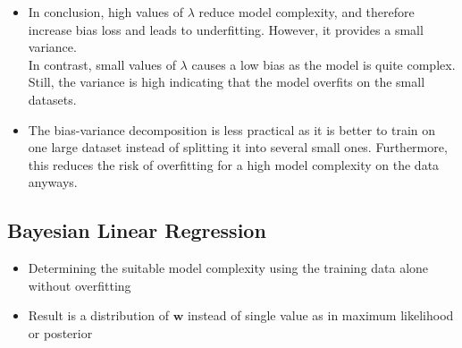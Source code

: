 \begin{itemize}
\begin{figure}[ht]
		\label{img:linear_regression_bias_variance_decomp_error_plot}
	\end{figure}
	\item In conclusion, high values of $\lambda$ reduce model complexity, and therefore increase bias loss and leads to underfitting. However, it provides a small variance.\\In contrast, small values of $\lambda$ causes a low bias as the model is quite complex. Still, the variance is high indicating that the model overfits on the small datasets.
	\item The bias-variance decomposition is less practical as it is better to train on one large dataset instead of splitting it into several small ones. Furthermore, this reduces the risk of overfitting for a high model complexity on the data anyways.
\end{itemize}
\subsection{Bayesian Linear Regression}
\begin{itemize}
	\item Determining the suitable model complexity using the training data alone without overfitting
	\item Result is a distribution of $\bm{w}$ instead of single value as in maximum likelihood or posterior
\end{itemize}

